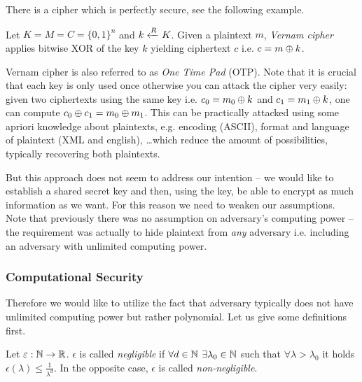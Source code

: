 There is a cipher which is perfectly secure, see the following example.

\begin{example}
	Let $K = M = C = \{0,1\}^n$ and $k\xleftarrow{R} K$. Given a plaintext $m$, {\em Vernam cipher} applies bitwise XOR of the key $k$ yielding ciphertext $c$ i.e. $c = m\oplus k$.
\end{example}

\begin{note}
	Vernam cipher is also referred to as {\em One Time Pad} (OTP). Note that it is crucial that each key is only used once otherwise you can attack the cipher very easily: given two ciphertexts using the same key i.e. $c_0=m_0\oplus k$ and $c_1=m_1\oplus k$, one can compute $c_0\oplus c_1 = m_0\oplus m_1$. This can be practically attacked using some apriori knowledge about plaintexts, e.g. encoding (ASCII), format and language of plaintext (XML and english), \ldots which reduce the amount of possibilities, typically recovering both plaintexts.
\end{note}

But this approach does not seem to address our intention -- we would like to establish a shared secret key and then, using the key, be able to encrypt as much information as we want. For this reason we need to weaken our assumptions. Note that previously there was no assumption on adversary's computing power -- the requirement was actually to hide plaintext from {\em any} adversary i.e. including an adversary with unlimited computing power.

\subsubsection{Computational Security}

Therefore we would like to utilize the fact that adversary typically does not have unlimited computing power but rather polynomial. Let us give some definitions first.   %

\begin{defn}
\label{def:neglfunc}
	Let $\varepsilon:\mathbb{N}\rightarrow\mathbb{R}$. $\epsilon$ is called {\em negligible} if $\forall d\in\mathbb{N}$ $\exists \lambda_0\in\mathbb{N}$ such that $\forall \lambda>\lambda_0$ it holds $\epsilon(\lambda)\leq\frac{1}{\lambda^d}$. In the opposite case, $\epsilon$ is called {\em non-negligible}.
\end{defn}

